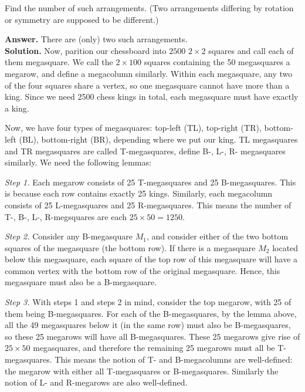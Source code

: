 \documentclass[11pt]{article}
\newcommand{\<}{\langle}
\renewcommand{\>}{\rangle}
\begin{document}
\begin{enumerate}
	Find the number of such arrangements. (Two arrangements differing by rotation or symmetry are supposed to be different.)
	
	\textbf{Answer.} There are (only) two such arrangements. \\
	\textbf{Solution.} Now, parition our chessboard into $2500$ $2\times 2$ squares and call each of them megasquare. We call the $2\times 100$ squares containing the 50 megasquares a megarow, and define a megacolumn similarly. Within each megasquare, any two of the four squares share a vertex, so one megasquare cannot have more than a king. Since we need 2500 chess kings in total, each megasquare must have exactly a king. 
	
	Now, we have four types of megasquares: top-left (TL), top-right (TR), bottom-left (BL), bottom-right (BR), depending where we put our king. TL megasquares and TR megasquares are called T-megasquares, define B-, L-, R- megasquares similarly. We need the following lemmas: 
	
	\emph{Step 1.} Each megarow consists of 25 T-megasquares and 25 B-megasquares. This is because each row contains exactly 25 kings. Similarly, each megacolumn consists of 25 L-megasquares and 25 R-megasquares. This means the number of T-, B-, L-, R-megsquares are each $25\times 50=1250$. 
	
	\emph{Step 2.} Consider any B-megasquare $M_1$, and consider either of the two bottom squares of the megasquare (the bottom row). If there is a megasquare $M_2$ located below this megasquare, each square of the top row of this megasquare will have a common vertex with the bottom row of the original megasquare. Hence, this megasquare must also be a B-megasquare. 
	
	\emph{Step 3.} With steps 1 and steps 2 in mind, consider the top megarow, with 25 of them being B-megasquares. For each of the B-megasquares, by the lemma above, all the 49 megasquares below it (in the same row) must also be B-megasquares, so these 25 megarows will have all B-megasquares. These 25 megarows give rise of $25\times 50$ megasquares, and therefore the remaining 25 megarows must all be T-megasquares. This means the notion of T- and B-megacolumns are well-defined: the megarow with either all T-megasquares or B-megasquares. Similarly the notion of L- and R-megarows are also well-defined. 
	

\end{enumerate}
\end{document}
